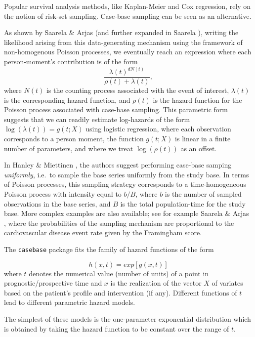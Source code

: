 \documentclass[article]{jss}
\begin{document}
Popular survival analysis methods, like Kaplan-Meier and Cox regression,
rely on the notion of risk-set sampling. Case-base sampling can be seen
as an alternative.

As shown by Saarela \& Arjas \citeyearpar{saarela2015non} (and further
expanded in Saarela \citeyearpar{saarela2016case}), writing the
likelihood arising from this data-generating mechanism using the
framework of non-homogenous Poisson processes, we eventually reach an
expression where each person-moment's contribution is of the form
\[\frac{\lambda(t)^{dN(t)}}{\rho(t) + \lambda(t)},\] where \(N(t)\) is
the counting process associated with the event of interest,
\(\lambda(t)\) is the corresponding hazard function, and \(\rho(t)\) is
the hazard function for the Poisson process associated with case-base
sampling. This parametric form suggests that we can readily estimate
log-hazards of the form \(\log(\lambda(t)) = g(t; X)\) using logistic
regression, where each observation corresponds to a person moment, the
function \(g(t; X)\) is linear in a finite number of parameters, and
where we treat \(\log(\rho(t))\) as an offset.

In Hanley \& Miettinen \citeyearpar{hanley2009fitting}, the authors
suggest performing case-base samping \emph{uniformly}, i.e.~to sample
the base series uniformly from the study base. In terms of Poisson
processes, this sampling strategy corresponds to a time-homogeneous
Poisson process with intensity equal to \(b/B\), where \(b\) is the
number of sampled observations in the base series, and \(B\) is the
total population-time for the study base. More complex examples are also
available; see for example Saarela \& Arjas
\citeyearpar{saarela2015non}, where the probabilities of the sampling
mechanism are proportional to the cardiovascular disease event rate
given by the Framingham score.

The \texttt{casebase} package fits the family of hazard functions of the
form

\[ h(x,t) = exp[g(x,t)] \] where \(t\) denotes the numerical value
(number of units) of a point in prognostic/prospective time and \(x\) is
the realization of the vector \(X\) of variates based on the patient's
profile and intervention (if any). Different functions of \(t\) lead to
different parametric hazard models.

The simplest of these models is the one-parameter exponential
distribution which is obtained by taking the hazard function to be
constant over the range of \(t\).
\end{document}
